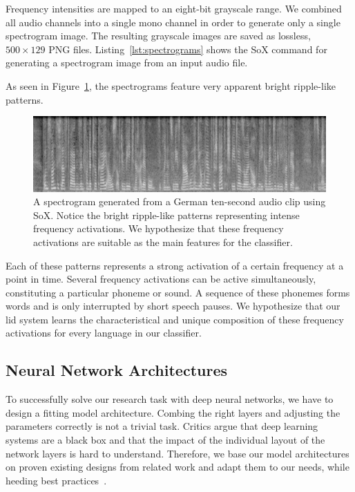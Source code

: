 Frequency intensities are mapped to an eight-bit grayscale range. We combined all audio channels into a single mono channel in order to generate only a single spectrogram image. The resulting grayscale images are saved as lossless, $500 \times 129$ PNG files. Listing~\ref{lst:spectrograms} shows the SoX command for generating a spectrogram image from an input audio file.


	As seen in Figure~\ref{fig:spectrogram}, the spectrograms feature very apparent bright ripple-like patterns.
%
	\begin{figure}[tp]
  		\centering
    	\includegraphics[width=\textwidth,keepaspectratio]{img/spectrogram.png}
    	\caption{A spectrogram generated from a German ten-second audio clip using SoX. Notice the bright ripple-like patterns representing intense frequency activations. We hypothesize that these frequency activations are suitable as the main features for the classifier.}
    	\label{fig:spectrogram}
	\end{figure}
%
	Each of these patterns represents a strong activation of a certain frequency at a point in time. Several frequency activations can be active simultaneously, constituting a particular phoneme or sound. A sequence of these phonemes forms words and is only interrupted by short speech pauses. We hypothesize that our \ac{lid} system learns the characteristical and unique composition of these frequency activations for every language in our classifier.

\subsection{Neural Network Architectures}
\label{sec:cnn_architecture}
To successfully solve our research task with deep neural networks, we have to design a fitting model architecture. Combing the right layers and adjusting the parameters correctly is not a trivial task. Critics argue that deep learning systems are a black box and that the impact of the individual layout of the network layers is hard to understand. Therefore, we base our model architectures on proven existing designs from related work and adapt them to our needs, while heeding best practices~\cite{mishkin2016systematic, szegedy2016rethinking}.


